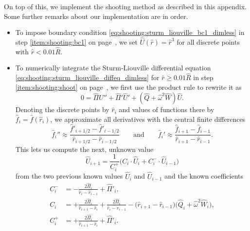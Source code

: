 On top of this, we implement the shooting method as described in this appendix.
Some further remarks about our implementation are in order.
\begin{itemize}
\item To impose boundary condition \eqref{eq:shooting:sturm_liouville_bc1_dimless} in step \ref{item:shooting:bc1} on page~\pageref{item:shooting:bc1}, we set $\hat{U}(\hat{r}) = \hat{r}^3$ for all discrete points with $\hat{r} < 0.01 \hat{R}$.
\item To numerically integrate the Sturm-Liouville differential equation \eqref{eq:shooting:sturm_liouville_diffeq_dimless} for $\hat{r} \geq 0.01 \hat{R}$ in step \ref{item:shooting:shoot} on page~\pageref{item:shooting:shoot}, we first use the product rule to rewrite it as
      \begin{equation}
	      0 = \hat{\Pi} \hat{U}'' + \hat{\Pi}' \hat{U}' + \left( \hat{Q} + \hat{\omega}^2 \hat{W} \right) \hat{U} .
      \end{equation}
      Denoting the discrete points by $\hat{r}_i$ and values of functions there by $\hat{f}_i = \hat{f}(\hat{r}_i)$, we approximate all derivatives with the central finite differences
      \begin{equation}
          \hat{f}_i'' \approx \frac{\hat{f}'_{i+1/2}-\hat{f}'_{i-1/2}}{\hat{r}_{i+1/2}-\hat{r}_{i-1/2}}
          \qquad \text{and} \qquad
          \hat{f}_i' \approx \frac{\hat{f}_{i+1}-\hat{f}_{i-1}}{\hat{r}_{i+1}-\hat{r}_{i-1}} .
      \end{equation}
      This lets us compute the next, unknown value
      \begin{equation}
            \hat{U}_{i+1} = \frac{1}{C^+_i} \Big( C_i \cdot \hat{U}_i + C^-_i \cdot \hat{U}_{i-1} \Big)
      \end{equation}
      from the two previous known values $\hat{U}_i$ and $\hat{U}_{i-1}$ and the known coefficients
      \begin{subequations}
      \begin{align}
          C^-_i             &= -\frac{2 \hat{\Pi}_i}{\hat{r}_i-\hat{r}_{i-1}} + \hat{\Pi}'_i , \\
          C^{\phantom{-}}_i &= +\frac{2 \hat{\Pi}_i}{\hat{r}_{i+1}-\hat{r}_i} + \frac{2 \hat{\Pi}_i}{\hat{r}_i-\hat{r}_{i-1}} - \Big( \hat{r}_{i+1} - \hat{r}_{i-1} \Big) \Big( \hat{Q}_i + \hat{\omega}^2 \hat{W}_i \Big) , \\
          C^+_i             &= +\frac{2 \hat{\Pi}_i}{\hat{r}_{i+1}-\hat{r}_i} + \hat{\Pi}'_i .
      \end{align}

\end{subequations}
\end{itemize}
